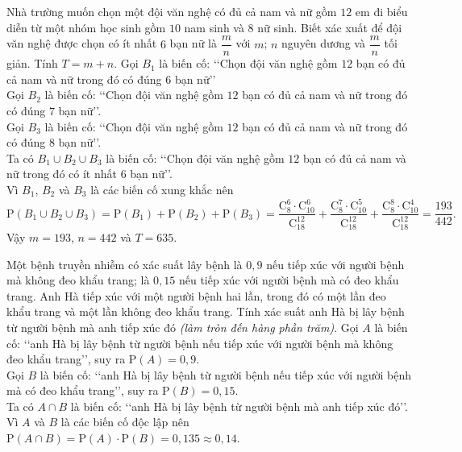 \begin{bt}%
Nhà trường muốn chọn một đội văn nghệ có đủ cả nam và nữ gồm $12$ em đi biểu diễn từ một nhóm học sinh gồm $10$ nam sinh và $8$ nữ sinh. Biết xác xuất để đội văn nghệ được chọn có ít nhất $6$ bạn nữ là $\dfrac{m}{n}$ với $m$; $n$ nguyên dương và $\dfrac{m}{n}$ tối giản. Tính $T=m+n$.
\loigiai
{
Gọi $B_1$ là biến cố: \lq\lq Chọn đội văn nghệ gồm $12$ bạn có đủ cả nam và nữ trong đó có đúng $6$ bạn nữ\rq\rq\\
Gọi $B_2$ là biến cố: \lq\lq Chọn đội văn nghệ gồm $12$ bạn có đủ cả nam và nữ trong đó có đúng $7$ bạn nữ\rq\rq.\\
Gọi $B_3$ là biến cố: \lq\lq Chọn đội văn nghệ gồm $12$ bạn có đủ cả nam và nữ trong đó có đúng $8$ bạn nữ\rq\rq.\\
Ta có $B_1\cup B_2\cup B_3$ là biến cố: \lq\lq Chọn đội văn nghệ gồm $12$ bạn có đủ cả nam và nữ trong đó có ít nhất $6$ bạn nữ\rq\rq.\\
Vì $B_1$, $B_2$ và $B_3$ là các biến cố xung khắc nên \\
$$\mathrm{P}\left(B_1\cup B_2\cup B_3\right)=\mathrm{P}\left(B_1\right)+\mathrm{P}\left(B_2\right)+\mathrm{P}\left(B_3\right)=\dfrac{\mathrm{C}_{8}^{6}\cdot\mathrm{C}_{10}^{6}}{\mathrm{C}_{18}^{12}}+\dfrac{\mathrm{C}_{8}^{7}\cdot\mathrm{C}_{10}^{5}}{\mathrm{C}_{18}^{12}}+\dfrac{\mathrm{C}_{8}^{8}\cdot\mathrm{C}_{10}^{4}}{\mathrm{C}_{18}^{12}}=\dfrac{193}{442}.$$
Vậy $m=193$, $n=442$ và $T=635$.
}
\end{bt}

\begin{bt}%
Một bệnh truyền nhiễm có xác suất lây bệnh là $0{,}9$ nếu tiếp xúc với người bệnh mà không đeo khẩu trang; là $0{,}15$ nếu tiếp xúc với người bệnh mà có đeo khẩu trang. Anh Hà tiếp xúc với một người bệnh hai lần, trong đó có một lần đeo khẩu trang và một lần không đeo khẩu trang. Tính xác suất anh Hà bị lây bệnh từ người bệnh mà anh tiếp xúc đó \textit{(làm tròn đến hàng phần trăm)}.
\loigiai
{
Gọi $A$ là biến cố: \lq\lq anh Hà bị lây bệnh từ người bệnh nếu tiếp xúc với người bệnh mà không đeo khẩu trang\rq\rq, suy ra $\mathrm{P}(A)=0{,}9$.\\
Gọi $B$ là biến cố: \lq\lq anh Hà bị lây bệnh từ người bệnh nếu tiếp xúc với người bệnh mà có đeo khẩu trang\rq\rq, suy ra $\mathrm{P}(B)=0{,}15$.\\
Ta có $A\cap B$ là biến cố: \lq\lq anh Hà bị lây bệnh từ người bệnh mà anh tiếp xúc đó\rq\rq. \\
Vì $A$ và $B$ là các biến cố độc lập nên $\mathrm{P}(A\cap B)=\mathrm{P}(A)\cdot\mathrm{P}(B)=0{,}135\approx0{,}14$.
}
\end{bt}


